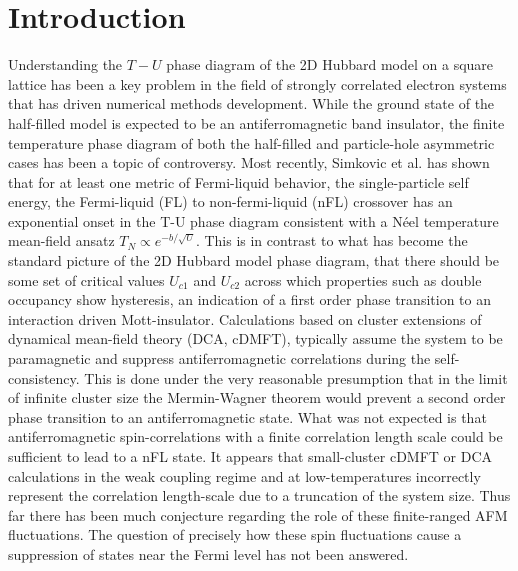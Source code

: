 \documentclass[twocolumn,notitlepage,prb,superscriptaddress,showpacs]{revtex4-1}
\begin{document}
\section{Introduction \label{sec:introduction}}
Understanding the $T-U$ phase diagram of the 2D Hubbard model on a square lattice has been a key problem  in the field of strongly correlated electron systems that has driven numerical methods development.
While the ground state of the half-filled model is expected to be an antiferromagnetic band insulator, the finite temperature phase diagram of both the half-filled and particle-hole asymmetric cases has been a topic of controversy.\cite{schafer:2015}
Most recently, Simkovic et al. \cite{simkovic:2019, simkovic2017determinant} has shown that for at least one metric of Fermi-liquid behavior, the single-particle self energy\cite{park:2008},  the Fermi-liquid (FL) to non-fermi-liquid (nFL) crossover has an exponential onset in the T-U phase diagram consistent with a N\'eel temperature mean-field ansatz $T_N\propto e^{-b/\sqrt{U}}$. 
This is in contrast to what has become the standard picture of the 2D Hubbard model phase diagram,\cite{park:2008} that there should be some set of critical values $U_{c1}$ and $U_{c2}$ across which properties such as double occupancy show hysteresis, an indication of a first order phase transition to an interaction driven Mott-insulator. 
Calculations based on cluster extensions of dynamical mean-field theory (DCA, cDMFT), typically assume the system to be paramagnetic and suppress antiferromagnetic correlations during the self-consistency.  This is done under the very reasonable presumption that in the limit of infinite cluster size the Mermin-Wagner theorem would prevent a  second order phase transition to an antiferromagnetic state.  
What was not expected is that antiferromagnetic spin-correlations with a finite correlation length scale could be sufficient to lead to a nFL state.  
It appears that small-cluster cDMFT or DCA calculations in the weak coupling regime and at low-temperatures incorrectly represent the correlation length-scale due to a truncation of the system size.\cite{georges:1996, leblanc:2013}
Thus far there has been much conjecture regarding the role of these finite-ranged AFM fluctuations.\cite{schafer:2015}
The question of precisely how these spin fluctuations cause a suppression of states near the Fermi level has not been answered.
\end{document}
